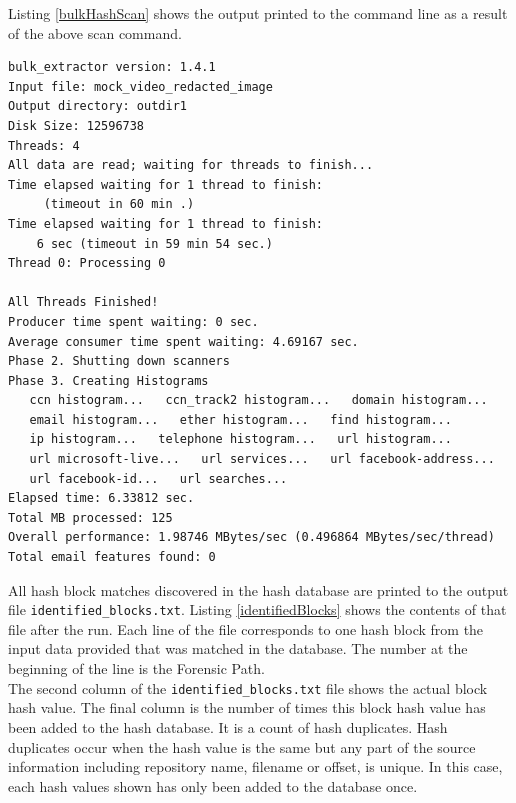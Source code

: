 \documentclass[11pt,fleqn]{article} %
\begin{document}
Listing \ref{bulkHashScan} shows the output printed to the command line as a result of the above \bulk \hash scan command. \\

\lstset{style=customfile}
\begin{lstlisting}[float, caption=Output from \bulk \hash scan, label=bulkHashScan]
bulk_extractor version: 1.4.1
Input file: mock_video_redacted_image
Output directory: outdir1
Disk Size: 12596738
Threads: 4
All data are read; waiting for threads to finish...
Time elapsed waiting for 1 thread to finish:
     (timeout in 60 min .)
Time elapsed waiting for 1 thread to finish:
    6 sec (timeout in 59 min 54 sec.)
Thread 0: Processing 0

All Threads Finished!
Producer time spent waiting: 0 sec.
Average consumer time spent waiting: 4.69167 sec.
Phase 2. Shutting down scanners
Phase 3. Creating Histograms
   ccn histogram...   ccn_track2 histogram...   domain histogram...
   email histogram...   ether histogram...   find histogram...
   ip histogram...   telephone histogram...   url histogram...
   url microsoft-live...   url services...   url facebook-address...
   url facebook-id...   url searches...
Elapsed time: 6.33812 sec.
Total MB processed: 125
Overall performance: 1.98746 MBytes/sec (0.496864 MBytes/sec/thread)
Total email features found: 0
\end{lstlisting}

All hash block matches discovered in the hash database are printed to the \bulk output file \texttt{identified\_blocks.txt}. Listing \ref{identifiedBlocks} shows the contents of that file after the \bulk run. Each line of the file corresponds to one hash block from the input data provided that was matched in the database. The number at the beginning of the line is the Forensic Path.\\


The second column of the \texttt{identified\_blocks.txt} file shows the actual block hash value. The final column is the number of times this block hash value has been added to the hash database. It is a count of hash duplicates. Hash duplicates occur when the hash value is the same but any part of the source information including repository name, filename or offset, is unique. In this case, each hash values shown has only been added to the database once.\\
\end{document}
